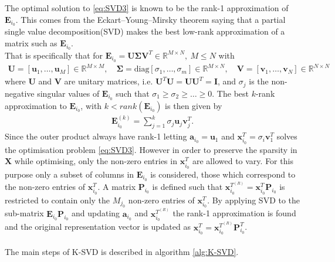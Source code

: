 The optimal solution to \eqref{eq:SVD3} is known to be the rank-1 approximation of $\textbf{E}_{i_{0}}$. This comes from the Eckart–Young–Mirsky theorem\cite{?} saying that a partial single value decomposition(SVD) makes the best low-rank approximation of a matrix such as $\textbf{E}_{i_0}$.\\
That is specifically that for $\textbf{E}_{i_0}=\textbf{U}\boldsymbol{\Sigma}\textbf{V}^T\in \mathbb{R}^{M\times N},\ M \leq N$ with 
\begin{align*}
\textbf{U}=\left[\textbf{u}_1, \hdots, \textbf{u}_M\right] \in \mathbb{R}^{M\times M}, \quad \boldsymbol{\Sigma}=\text{diag}\left[\sigma_1, \hdots , \sigma_m \right] \in \mathbb{R}^{M\times N}, \quad \textbf{V}=\left[\textbf{v}_1, \hdots, \textbf{v}_N\right] \in \mathbb{R}^{N\times N} 
\end{align*}  
where $\textbf{U}$ and $\textbf{V}$ are unitary matrices, i.e. $\textbf{U}^T\textbf{U}=\textbf{UU}^T=\textbf{I}$, and $\sigma_j$ is the non-negative singular values of $\textbf{E}_{i_0}$ such that $\sigma_1\geq \sigma_2 \geq \hdots \geq 0$. The best $k$-rank approximation to $\textbf{E}_{i_0}$, with $k< rank(\textbf{E}_{i_0})$ is then given by\cite{Wiki..} 
\begin{align*}
\textbf{E}_{i_{0}}^{(k)}= \sum_{j=1}^{k}\sigma_j\textbf{u}_{j}\textbf{v}_{j}^T.
\end{align*} 
Since the outer product always have rank-1 letting $\textbf{a}_{i_0}=\textbf{u}_1$ and $\textbf{x}_{i_0}^T = \sigma_{i}\textbf{v}_{1}^T$ solves the optimisation problem \eqref{eq:SVD3}.
However in order to preserve the sparsity in $\textbf{X}$ while optimising, only the non-zero entries in $\textbf{x}_{i_0}^T$ are allowed to vary. For this purpose only a subset of columns in $\textbf{E}_{i_0}$ is considered, those which correspond to the non-zero entries of $\textbf{x}_{i_0}^T$. A matrix $\textbf{P}_{i_0}$ is defined such that $\textbf{x}_{i_0}^{T^{(R)}}=\textbf{x}_{i_0}^T\textbf{P}_{i_0} $ is restricted to contain only the $M_{j_0}$ non-zero entries of $\textbf{x}_{i_0}^T$. By applying SVD to the  sub-matrix $\textbf{E}_{i_0}\textbf{P}_{i_0}$ and updating $\textbf{a}_{i_0}$ and $\textbf{x}_{i_0}^{T^{(R)}}$ the rank-1 approximation is found and the original representation vector is updated as $\textbf{x}_{i_0}^{T}=\textbf{x}_{i_0}^{T^{(R)}}\textbf{P}_{i_0}^{T}$.  \\ \\
The main steps of K-SVD is described in algorithm \ref{alg:K-SVD}. 

